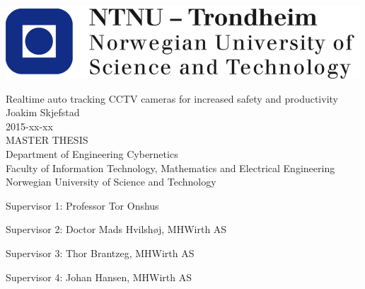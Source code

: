 \thispagestyle{empty}

\includegraphics[scale=0.35, bb=0 0 30 30]{NTNULogo.png}

\begin{center}
\Huge{Realtime auto tracking CCTV cameras for increased safety and productivity}\\[2pc]

\Large{Joakim Skjefstad}\\[1pc]
\large{2015-xx-xx}\\[2pc]

MASTER THESIS\\
Department of Engineering Cybernetics\\
Faculty of Information Technology, Mathematics and Electrical Engineering\\
Norwegian University of Science and Technology
\end{center}
\vfill

\noindent Supervisor 1: Professor Tor Onshus

\noindent Supervisor 2: Doctor Mads Hvilshøj, MHWirth AS

\noindent Supervisor 3: Thor Brantzeg, MHWirth AS

\noindent Supervisor 4: Johan Hansen, MHWirth AS

\newpage
\thispagestyle{empty}
\mbox{}
\newpage